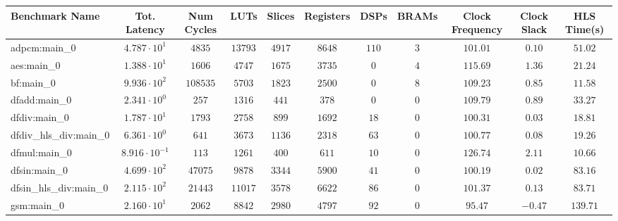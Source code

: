 \begin{tabular}{|l|c|c|c|c|c|c|c|c|c|c|}
\hline
Benchmark Name          & Tot. Latency            & Num Cycles & LUTs      & Slices    & Registers & DSPs    & BRAMs  & Clock Frequency & Clock Slack & HLS Time(s) \\
\hline
adpcm:main\_0           & $ 4.787 \cdot 10^{1}  $ & $ 4835   $ & $ 13793 $ & $ 4917  $ & $ 8648  $ & $ 110 $ & $ 3  $ & $ 101.01      $ & $ 0.10    $ & $ 51.02   $ \\
aes:main\_0             & $ 1.388 \cdot 10^{1}  $ & $ 1606   $ & $ 4747  $ & $ 1675  $ & $ 3735  $ & $ 0   $ & $ 4  $ & $ 115.69      $ & $ 1.36    $ & $ 21.24   $ \\
bf:main\_0              & $ 9.936 \cdot 10^{2}  $ & $ 108535 $ & $ 5703  $ & $ 1823  $ & $ 2500  $ & $ 0   $ & $ 8  $ & $ 109.23      $ & $ 0.85    $ & $ 11.58   $ \\
dfadd:main\_0           & $ 2.341 \cdot 10^{0}  $ & $ 257    $ & $ 1316  $ & $ 441   $ & $ 378   $ & $ 0   $ & $ 0  $ & $ 109.79      $ & $ 0.89    $ & $ 33.27   $ \\
dfdiv:main\_0           & $ 1.787 \cdot 10^{1}  $ & $ 1793   $ & $ 2758  $ & $ 899   $ & $ 1692  $ & $ 18  $ & $ 0  $ & $ 100.31      $ & $ 0.03    $ & $ 18.81   $ \\
dfdiv\_hls\_div:main\_0 & $ 6.361 \cdot 10^{0}  $ & $ 641    $ & $ 3673  $ & $ 1136  $ & $ 2318  $ & $ 63  $ & $ 0  $ & $ 100.77      $ & $ 0.08    $ & $ 19.26   $ \\
dfmul:main\_0           & $ 8.916 \cdot 10^{-1} $ & $ 113    $ & $ 1261  $ & $ 400   $ & $ 611   $ & $ 10  $ & $ 0  $ & $ 126.74      $ & $ 2.11    $ & $ 10.66   $ \\
dfsin:main\_0           & $ 4.699 \cdot 10^{2}  $ & $ 47075  $ & $ 9878  $ & $ 3344  $ & $ 5900  $ & $ 41  $ & $ 0  $ & $ 100.19      $ & $ 0.02    $ & $ 83.16   $ \\
dfsin\_hls\_div:main\_0 & $ 2.115 \cdot 10^{2}  $ & $ 21443  $ & $ 11017 $ & $ 3578  $ & $ 6622  $ & $ 86  $ & $ 0  $ & $ 101.37      $ & $ 0.13    $ & $ 83.71   $ \\
gsm:main\_0             & $ 2.160 \cdot 10^{1}  $ & $ 2062   $ & $ 8842  $ & $ 2980  $ & $ 4797  $ & $ 92  $ & $ 0  $ & $ 95.47       $ & $ -0.47   $ & $ 139.71  $ \\

\end{tabular}
